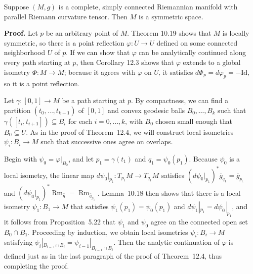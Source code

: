 \begin{theorem}
\label{thm:parallel-riemann-curvature-implies-symmetry}

Suppose $(M,g)$ is a complete, simply connected Riemannian manifold with parallel Riemann curvature tensor. Then $M$ is a symmetric space.

\textbf{Proof.} Let $p$ be an arbitrary point of $M$. Theorem 10.19 shows that $M$ is locally symmetric, so there is a point reflection $\varphi: U \to U$ defined on some connected neighborhood $U$ of $p$. If we can show that $\varphi$ can be analytically continued along every path starting at $p$, then Corollary 12.3 shows that $\varphi$ extends to a global isometry $\Phi: M \to M$; because it agrees with $\varphi$ on $U$, it satisfies $d\Phi_p = d\varphi_p = -\text{Id}$, so it is a point reflection.

Let $\gamma : [0,1] \to M$ be a path starting at $p$. By compactness, we can find a partition $(t_0, \ldots, t_{k+1})$ of $[0,1]$ and convex geodesic balls $B_0, \ldots, B_k$ such that $\gamma([t_i, t_{i+1}]) \subseteq B_i$ for each $i = 0, \ldots, k$, with $B_0$ chosen small enough that $B_0 \subseteq U$. As in the proof of Theorem~12.4, we will construct local isometries $\psi_i : B_i \to M$ such that successive ones agree on overlaps.

Begin with $\psi_0 = \varphi|_{B_0}$, and let $p_1 = \gamma(t_1)$ and $q_1 = \psi_0(p_1)$. Because $\psi_0$ is a local isometry, the linear map $d\psi_0|_{p_1} : T_{p_1}M \to T_{q_1}M$ satisfies $(d\psi_0|_{p_1})^* \bar{g}_{q_1} = \bar{g}_{p_1}$ and $(d\psi_0|_{p_1})^*\operatorname{Rm}_{\bar{g}} = \operatorname{Rm}_{\bar{g}_{p_1}}$. Lemma~10.18 then shows that there is a local isometry $\psi_1 : B_1 \to M$ that satisfies $\psi_1(p_1) = \psi_0(p_1)$ and $d\psi_1|_{p_1} = d\psi_0|_{p_1}$, and it follows from Proposition~5.22 that $\psi_1$ and $\psi_0$ agree on the connected open set $B_0 \cap B_1$. Proceeding by induction, we obtain local isometries $\psi_i : B_i \to M$ satisfying $\psi_i|_{B_{i-1}\cap B_i} = \psi_{i-1}|_{B_{i-1}\cap B_i}$. Then the analytic continuation of $\varphi$ is defined just as in the last paragraph of the proof of Theorem~12.4, thus completing the proof.
\end{theorem}

